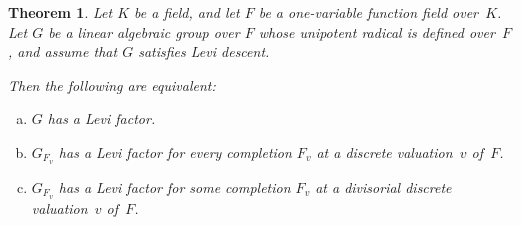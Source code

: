 \documentclass[12pt]{amsart}
\theoremstyle{plain}
\newtheorem{thm}{Theorem}[section]
\theoremstyle{definition}
\theoremstyle{remark}
\begin{document}
\begin{thm}\label{LGP}
Let $K$ be a field, and let $F$ be 
a one-variable function field over~$K$.
Let $G$ be a linear algebraic group over $F$ whose unipotent radical is defined over~$F$, and assume that $G$ satisfies Levi descent.  

Then the following are equivalent:
\begin{enumerate} [(a)]
\item $G$ has a Levi factor.
\item $G_{F_v}$ has a Levi factor for every completion $F_v$ at a discrete valuation~$v$ of~$F$.
\item $G_{F_v}$ has a Levi factor for some completion $F_v$ at a divisorial discrete valuation~$v$ of~$F$. 
\end{enumerate}
\end{thm}
\end{document}
